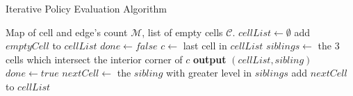 \documentclass{article}
\begin{document}
    \begin{algorithm} \caption{Iterative Policy Evaluation Algorithm}
        \begin{algorithmic}[1]
            \Require Map of cell and edge's count $\mathcal M$, list of empty cells  $\mathcal C$.
                \State $cellList \gets \emptyset$ 
                \State add $emptyCell$ to $cellList$
                \State $done \gets false$
                \Repeat
                    \State $c \gets $ last cell in $cellList$ 
                    \State $siblings \gets $ the 3 cells which intersect the interior corner of $c$
                        \State \textbf{output} $(cellList, sibling)$
                        \State $done \gets true$
                    \Else
                        \State $nextCell \gets$ the $sibling$ with greater level in $siblings$
                        \State add $nextCell$ to $cellList$
                    \EndIf
            \EndFor
        \end{algorithmic}
    \end{algorithm}
\end{document}
